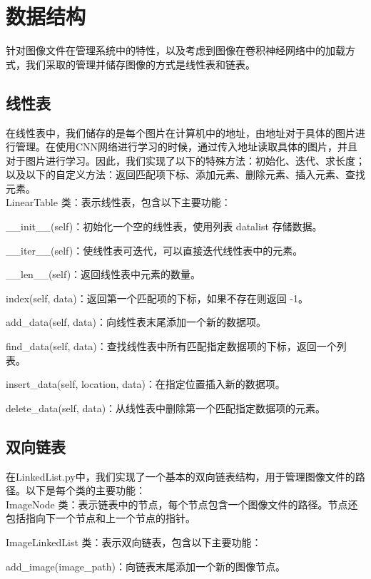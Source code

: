\section{数据结构}
针对图像文件在管理系统中的特性，以及考虑到图像在卷积神经网络中的加载方式，我们采取的管理并储存图像的方式是线性表和链表。

\subsection{线性表}
在线性表中，我们储存的是每个图片在计算机中的地址，由地址对于具体的图片进行管理。在使用CNN网络进行学习的时候，通过传入地址读取具体的图片，并且对于图片进行学习。因此，我们实现了以下的特殊方法：初始化、迭代、求长度；以及以下的自定义方法：返回匹配项下标、添加元素、删除元素、插入元素、查找元素。\\

\noindent LinearTable 类：表示线性表，包含以下主要功能：

\noindent \_\_init\_\_(self)：初始化一个空的线性表，使用列表 datalist 存储数据。

\noindent \_\_iter\_\_(self)：使线性表可迭代，可以直接迭代线性表中的元素。

\noindent \_\_len\_\_(self)：返回线性表中元素的数量。

\noindent index(self, data)：返回第一个匹配项的下标，如果不存在则返回 -1。

\noindent add\_data(self, data)：向线性表末尾添加一个新的数据项。

\noindent find\_data(self, data)：查找线性表中所有匹配指定数据项的下标，返回一个列表。

\noindent insert\_data(self, location, data)：在指定位置插入新的数据项。

\noindent delete\_data(self, data)：从线性表中删除第一个匹配指定数据项的元素。

\subsection{双向链表}
在LinkedList.py中，我们实现了一个基本的双向链表结构，用于管理图像文件的路径。以下是每个类的主要功能：\\

\noindent ImageNode 类：表示链表中的节点，每个节点包含一个图像文件的路径。节点还包括指向下一个节点和上一个节点的指针。

\noindent ImageLinkedList 类：表示双向链表，包含以下主要功能：

\noindent add\_image(image\_path)：向链表末尾添加一个新的图像节点。

